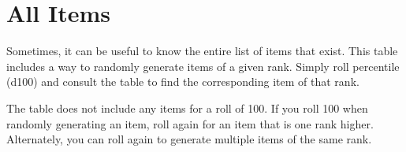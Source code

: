 \section{All Items}

  Sometimes, it can be useful to know the entire list of items that exist.
  This table includes a way to randomly generate items of a given rank.
  Simply roll percentile (d100) and consult the table to find the corresponding item of that rank.

  The table does not include any items for a roll of 100.
  If you roll 100 when randomly generating an item, roll again for an item that is one rank higher.
  Alternately, you can roll again to generate multiple items of the same rank.

  \begin{longcolumn}
    
  \end{longcolumn}
